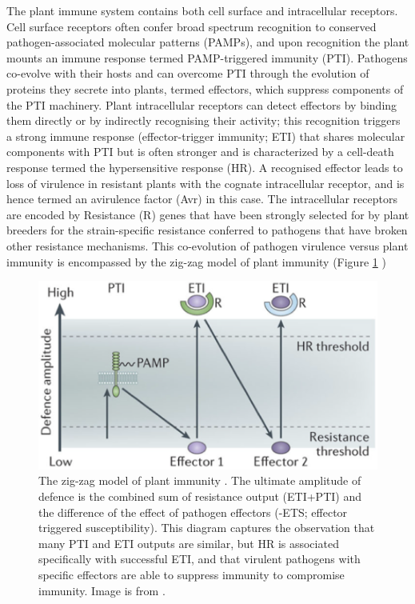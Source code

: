 \documentclass[12pt,]{book}
\begin{document}
The plant immune system contains both cell surface and intracellular
receptors. Cell surface receptors often confer broad spectrum
recognition to conserved pathogen-associated molecular patterns (PAMPs),
and upon recognition the plant mounts an immune response termed
PAMP-triggered immunity (PTI). Pathogens co-evolve with their hosts and
can overcome PTI through the evolution of proteins they secrete into
plants, termed effectors, which suppress components of the PTI
machinery. Plant intracellular receptors can detect effectors by binding
them directly or by indirectly recognising their activity; this
recognition triggers a strong immune response (effector-trigger
immunity; ETI) that shares molecular components with PTI but is often
stronger and is characterized by a cell-death response termed the
hypersensitive response (HR). A recognised effector leads to loss of
virulence in resistant plants with the cognate intracellular receptor,
and is hence termed an avirulence factor (Avr) in this case. The
intracellular receptors are encoded by Resistance (R) genes that have
been strongly selected for by plant breeders for the strain-specific
resistance conferred to pathogens that have broken other resistance
mechanisms. This co-evolution of pathogen virulence versus plant
immunity is encompassed by the zig-zag model of plant immunity (Figure
\ref{fig:zigzag} )










\begin{figure}
\includegraphics[width=9.78in]{assets/jones_fig1_prac} \caption{The zig-zag model of plant immunity \citep{Jones:2006ih}.
The ultimate amplitude of defence is the combined sum of resistance
output (ETI+PTI) and the difference of the effect of pathogen effectors
(-ETS; effector triggered susceptibility). This diagram captures the
observation that many PTI and ETI outputs are similar, but HR is
associated specifically with successful ETI, and that virulent pathogens
with specific effectors are able to suppress immunity to compromise
immunity. Image is from \citet{Pumplin:2013ix}.}\label{fig:zigzag}
\end{figure}
\end{document}
